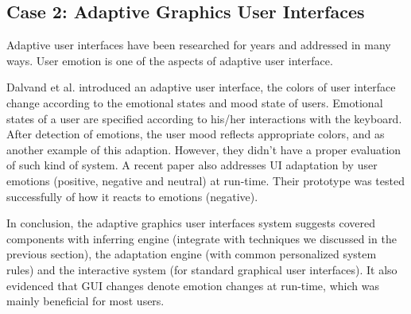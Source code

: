 \subsection{Case 2: Adaptive Graphics User Interfaces}
Adaptive user interfaces have been researched for years \cite{schneider1993adaptive, langley1997machine} and addressed in many ways. User emotion is one of the aspects of adaptive user interface.

Dalvand et al.\cite{Dalvand} introduced an adaptive user interface, the colors of user interface change according to the emotional states and mood state of users. Emotional states of a user are specified according to his/her interactions with the keyboard. After detection of emotions, the user mood reflects appropriate colors, and \cite{Kaiser2006} as another example of this adaption. However, they didn't have a proper evaluation of such kind of system.
A recent paper \cite{Galindo} also addresses UI adaptation by user emotions (positive, negative and neutral) at run-time. Their prototype was tested successfully of how it reacts to emotions (negative).

In conclusion, the adaptive graphics user interfaces system suggests covered components with inferring engine (integrate with techniques we discussed in the previous section), the adaptation engine (with common personalized system rules) and the interactive system (for standard graphical user interfaces). It also evidenced that GUI changes denote emotion changes at run-time, which was mainly beneficial for most users.
